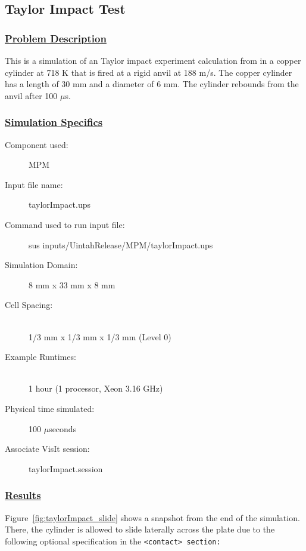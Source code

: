 \subsection*{\center Taylor Impact Test}
\subsubsection*{\underline{Problem Description}}
This is a simulation of an Taylor impact experiment calculation from 
\cite{Gust82} in a copper cylinder at 718 K that is fired at a
rigid anvil at 188 m/s.  The copper cylinder has a length of 30 mm and
a diameter of 6 mm.  The cylinder rebounds from the anvil after 100 $\mu$s.
 
\subsubsection*{\underline{Simulation Specifics}}
\begin{description} 
\item [Component used:] \hfill MPM
\item [Input file name:] \hfill taylorImpact.ups
\item [Command used to run input file:]\hfill \newline sus inputs/UintahRelease/MPM/taylorImpact.ups
\item [Simulation Domain:]\hfill 8 mm x 33 mm x 8 mm

\item [Cell Spacing:]\hfill \\ 
  1/3 mm x 1/3 mm x 1/3 mm (Level 0)

\item [Example Runtimes:] \hfill \\
  1 hour   (1 processor, Xeon 3.16 GHz)\\

\item [Physical time simulated:] \hfill 100 $\mu$seconds

\item [Associate VisIt session:] \hfill taylorImpact.session

\end{description}

\subsubsection*{\underline{Results}}
Figure~\ref{fig:taylorImpact_slide} shows a snapshot from the end of the simulation.
There, the cylinder is allowed to slide laterally across the plate due
to the following optional specification in the \tt <contact> \normalfont
section:

